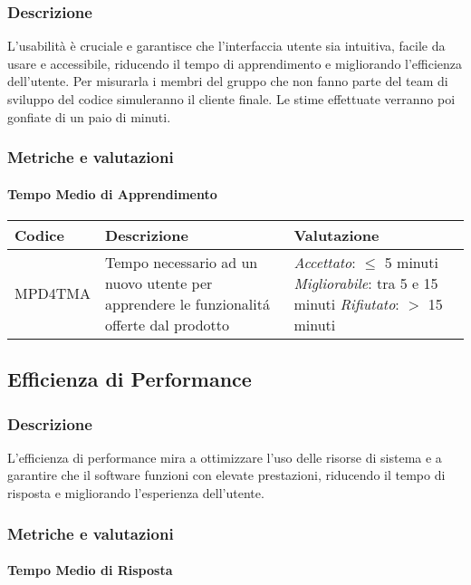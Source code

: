 \subsubsection{Descrizione}
L'usabilità è cruciale e garantisce che l'interfaccia utente sia intuitiva, facile da usare e accessibile, riducendo il tempo di apprendimento e migliorando l'efficienza dell'utente. Per misurarla i membri del gruppo che non fanno parte del team di sviluppo del codice simuleranno il cliente finale. Le stime effettuate verranno poi gonfiate di un paio di minuti. 
\subsubsection{Metriche e valutazioni}
\paragraph{Tempo Medio di Apprendimento}
\begin{table}[h]
\centering
\begin{tabular}{ |>{\centering\arraybackslash}m{3cm}|>{\centering\arraybackslash}m{8cm}|>{\centering\arraybackslash}m{5cm}| }
\hline
Codice & Descrizione & Valutazione\\
\hline
MPD4TMA & Tempo necessario ad un nuovo utente per apprendere le funzionalitá offerte dal prodotto &
\textit{Accettato}:  $\leq$ 5 minuti
\textit{Migliorabile}: tra 5 e 15 minuti
\textit{Rifiutato}:  $>$ 15 minuti\\
\hline
\end{tabular}
\end{table}

\subsection{Efficienza di Performance}
\subsubsection{Descrizione}
L'efficienza di performance mira a ottimizzare l'uso delle risorse di sistema e a garantire che il software funzioni con elevate prestazioni, riducendo il tempo di risposta e migliorando l'esperienza dell'utente.
\subsubsection{Metriche e valutazioni}
\paragraph{Tempo Medio di Risposta}


